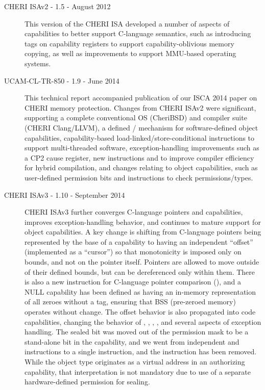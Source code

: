 \begin{description}
\item[CHERI ISAv2 - 1.5 - August 2012]
  This version of the CHERI ISA developed a number of aspects of capabilities
  to better support C-language semantics, such as introducing tags on
  capability registers to support capability-oblivious memory copying, as well
  as improvements to support MMU-based operating systems.

\item[UCAM-CL-TR-850 - 1.9 - June 2014]
  This technical report accompanied publication of our ISCA 2014 paper on
  CHERI memory protection.
  Changes from CHERI ISAv2 were significant, supporting a complete
  conventional OS (CheriBSD) and compiler suite (CHERI Clang/LLVM), a defined
  / mechanism
  for software-defined
  object capabilities, capability-based load-linked/store-conditional
  instructions to support multi-threaded software, exception-handling
  improvements such as a CP2 cause register, new instructions
   and  to improve compiler
  efficiency for hybrid compilation, and changes relating to object
  capabilities, such as user-defined permission bits and instructions to check
  permissions/types.

\item[CHERI ISAv3 - 1.10 - September 2014]
  CHERI ISAv3 further converges C-language pointers and capabilities, improves
  exception-handling behavior, and continues to mature support for
  object capabilities.
  A key change is shifting from C-language pointers being represented by the
  base of a capability to having an independent ``offset'' (implemented as a
  ``cursor'') so that monotonicity is imposed only on bounds, and not on the
  pointer itself.
  Pointers are allowed to move outside of their defined bounds, but can be
  dereferenced only within them.
  There is also a new instruction for C-language pointer comparison
  (), and a NULL capability has been defined
  as having
  an in-memory representation of all zeroes without a tag, ensuring that BSS
  (pre-zeroed memory) operates without change.
  The offset behavior is also propagated into code capabilities, changing the
  behavior of \PCC{}, \EPCC{}, , , and
  several aspects of exception handling.
  The sealed bit was moved out of the permission mask to be a stand-alone bit
  in the capability, and we went from independent 
  and  instructions to a single 
  instruction, and the  instruction has been removed.
  While the object type originates as a virtual address in an authorizing
  capability, that interpretation is not mandatory due to use of a separate
  hardware-defined permission for sealing.


\end{description}
